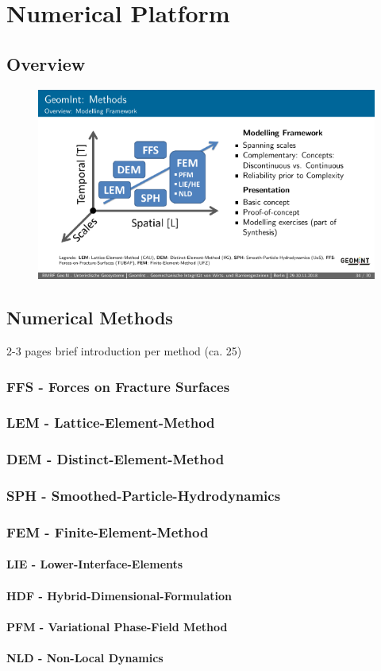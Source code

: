 \chapter{Numerical Platform}

\section{Overview} 

\begin{figure}[h!]
\centering
\includegraphics[width=1\textwidth]{figures/geomint-mod-overview}
\label{fig:20}
\caption{}
\end{figure}

\section{Numerical Methods}
2-3 pages brief introduction per method (ca. 25)
\subsection{FFS - Forces on Fracture Surfaces}
\subsection{LEM - Lattice-Element-Method}
\subsection{DEM - Distinct-Element-Method}
\subsection{SPH - Smoothed-Particle-Hydrodynamics}
\subsection{FEM - Finite-Element-Method}
\subsubsection{LIE - Lower-Interface-Elements}
\subsubsection{HDF - Hybrid-Dimensional-Formulation}
\subsubsection{PFM - Variational Phase-Field Method}
\subsubsection{NLD - Non-Local Dynamics}

